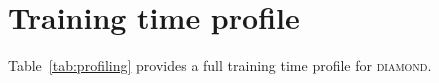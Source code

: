 \section{Training time profile}\label{app:profiling}

Table~\ref{tab:profiling} provides a full training time profile for \textsc{diamond}.

\label{tab:r}
